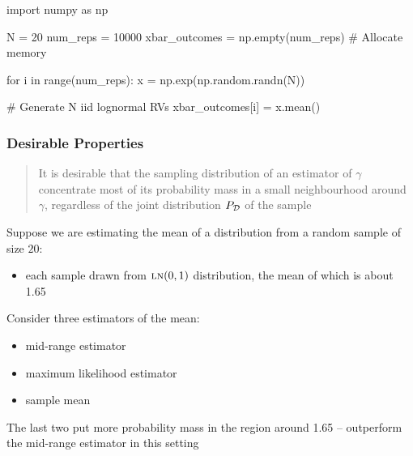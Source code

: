 \begin{frame}[fragile]

        \vspace{1em}
        \begin{pythoncode}
    import numpy as np
    
    N = 20
    num_reps = 10000
    xbar_outcomes = np.empty(num_reps)  # Allocate memory
    
    for i in range(num_reps):
        x = np.exp(np.random.randn(N))
        
        # Generate N iid lognormal RVs
        xbar_outcomes[i] = x.mean()
        \end{pythoncode}

\end{frame}

\begin{frame}\frametitle{Desirable Properties}

    \vspace{2em}
    \begin{quote}
    It is desirable that the sampling distribution of an estimator of $\gamma$
    concentrate most of its probability mass in a small neighbourhood around
    $\gamma$, regardless of the joint distribution $P_{\mathcal D}$ of the sample
    \end{quote}
      
\end{frame}

\begin{frame}

    \vspace{2em}
    Suppose we are estimating the mean of a distribution from a random sample
    of size $20$:
    \begin{itemize}
        \item each sample drawn from $\textrm{\sc ln}(0, 1)$
    distribution, the mean of which is about 1.65
    \end{itemize}
    
    \vspace{.7em}
    Consider three estimators of the mean:
    \begin{itemize}
        \item mid-range estimator
        \item maximum likelihood estimator 
        \item sample mean
    \end{itemize}
    
    The last two put more
    probability mass in the region around 1.65 -- outperform
    the mid-range estimator in this setting
    
\end{frame}

